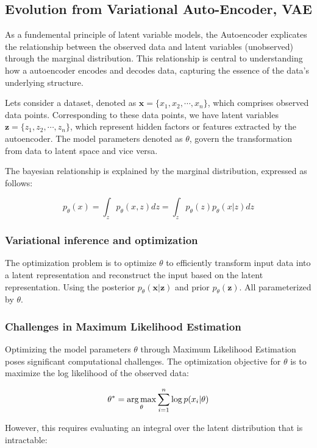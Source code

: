 \subsection{Evolution from Variational Auto-Encoder, VAE}
As a fundemental principle of latent variable models, the Autoencoder explicates the relationship between the observed data and latent variables (unobserved) through the marginal distribution. This relationship is central to understanding how a autoencoder encodes and decodes data, capturing the essence of the data's underlying structure.

Lets consider a dataset, denoted as $\mathbf{x}=\{x_1, x_2, \cdots, x_n \}$, which comprises observed data points. Corresponding to these data points, we have latent variables $\mathbf{z}=\{z_1, z_2, \cdots, z_n \}$, which represent hidden factors or features extracted by the autoencoder.
The model parameters denoted as $\theta$, govern the transformation from data to latent space and vice versa.

The bayesian relationship is explained by the marginal distribution, expressed as follows:

\begin{equation}
    p_\theta(x) = \int_zp_\theta(x, z) dz= \int_z p_\theta(z)p_\theta(x|z)dz    
\end{equation}
\subsubsection{Variational inference and optimization}
The optimization problem is to optimize $\theta$ to efficiently transform input data into a latent representation and reconstruct the input based on the latent representation.
Using the posterior $p_\theta(\mathbf{x}|\mathbf{z})$ and prior $p_\theta(\mathbf{z})$. All parameterized by $\theta$.
\subsubsection{Challenges in Maximum Likelihood Estimation}
Optimizing the model parameters \( \theta \) through Maximum Likelihood Estimation poses significant computational challenges. The optimization objective for \( \theta \) is to maximize the log likelihood of the observed data:

\begin{equation}
    \theta^* = \operatorname*{arg\,max}_\theta \sum_{i=1}^n \log p(x_i | \theta)
\end{equation}

However, this requires evaluating an integral over the latent distribution that is intractable:

